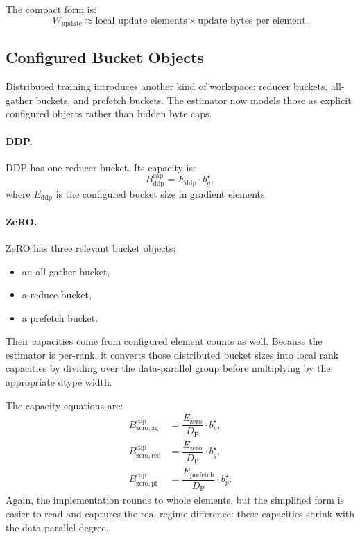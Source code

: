 The compact form is:
\[
W_{\mathrm{update}} \approx
\text{local update elements} \times \text{update bytes per element}.
\]

\subsection{Configured Bucket Objects}
Distributed training introduces another kind of workspace: reducer buckets,
all-gather buckets, and prefetch buckets. The estimator now models those as
explicit configured objects rather than hidden byte caps.

\paragraph{DDP.}
DDP has one reducer bucket. Its capacity is:
\[
B_{\mathrm{ddp}}^{\mathrm{cap}} =
E_{\mathrm{ddp}} \cdot b_g^\star,
\]
where $E_{\mathrm{ddp}}$ is the configured bucket size in gradient elements.

\paragraph{ZeRO.}
ZeRO has three relevant bucket objects:
\begin{itemize}[leftmargin=1.5em]
\item an all-gather bucket,
\item a reduce bucket,
\item a prefetch bucket.
\end{itemize}

Their capacities come from configured element counts as well. Because the
estimator is per-rank, it converts those distributed bucket sizes into local
rank capacities by dividing over the data-parallel group before multiplying by
the appropriate dtype width.

The capacity equations are:
\begin{align*}
B_{\mathrm{zero,ag}}^{\mathrm{cap}} &=
\dfrac{E_{\mathrm{zero}}}{D_{\mathrm{P}}} \cdot b_p^\star, \\
B_{\mathrm{zero,red}}^{\mathrm{cap}} &=
\dfrac{E_{\mathrm{zero}}}{D_{\mathrm{P}}} \cdot b_g^\star, \\
B_{\mathrm{zero,pf}}^{\mathrm{cap}} &=
\dfrac{E_{\mathrm{prefetch}}}{D_{\mathrm{P}}} \cdot b_p^\star.
\end{align*}
Again, the implementation rounds to whole elements, but the simplified form is
easier to read and captures the real regime difference: these capacities shrink
with the data-parallel degree.

